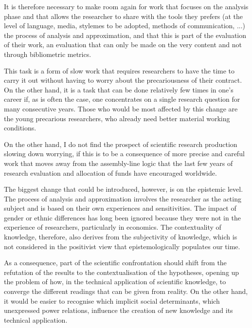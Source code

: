 \documentclass[a4paper, headings=standardclasses]{scrartcl}
\begin{document}
It is therefore necessary to make room again for work that focuses on the analysis phase and that allows the researcher to share with the tools they prefers (at the level of language, media, stylemes to be adopted, methods of communication, ...) the process of analysis and approximation, and that this is part of the evaluation of their work, an evaluation that can only be made on the very content and not through bibliometric metrics.

This task is a form of slow work that requires researchers to have the time to carry it out without having to worry about the precariousness of their contract. On the other hand, it is a task that can be done relatively few times in one's career if, as is often the case, one concentrates on a single research question for many consecutive years.
Those who would be most affected by this change are the young precarious researchers, who already need better material working conditions.

On the other hand, I do not find the prospect of scientific research production slowing down worrying, if this is to be a consequence of more precise and careful work that moves away from the assembly-line logic that the last few years of research evaluation and allocation of funds have encouraged worldwide.

The biggest change that could be introduced, however, is on the epistemic level.
The process of analysis and approximation involves the researcher as the acting subject and is based on their own experiences and sensitivities.
The impact of gender or ethnic differences has long been ignored because they were not in the experience of researchers, particularly in economics.
The contextuality of knowledge, therefore, also derives from the subjectivity of knowledge, which is not considered in the positivist view that epistemologically populates our time.

As a consequence, part of the scientific confrontation should shift from the refutation of the results to the contextualisation of the hypotheses, opening up the problem of how, in the technical application of scientific knowledge, to converge the different readings that can be given from reality.
On the other hand, it would be easier to recognise which implicit social determinants, which unexpressed power relations, influence the creation of new knowledge and its technical application.
\end{document}
